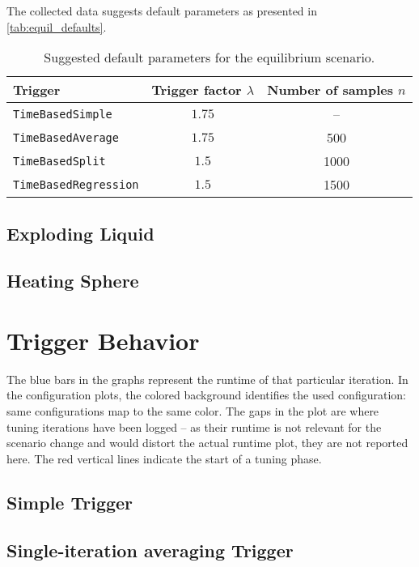 The collected data suggests default parameters as presented in \autoref{tab:equil_defaults}.
\begin{table}[htpb]
	\centering
	\begin{tabular}{lcc}
		\toprule
		\textbf{Trigger}                      & \textbf{Trigger factor $\lambda$} & \textbf{Number of samples $n$} \\ [0em]
		\midrule
		\texttt{TimeBasedSimple}     & $1.75$                   & --                     \\
		\texttt{TimeBasedAverage}    & $1.75$                   & 500                   \\
		\texttt{TimeBasedSplit}      & $1.5$                    & 1000                  \\
		\texttt{TimeBasedRegression} & $1.5$                    & 1500                  \\
		\bottomrule
	\end{tabular}
	\caption{Suggested default parameters for the equilibrium scenario.}
	\label{tab:equil_defaults}
\end{table}

\subsection{Exploding Liquid}
\subsection{Heating Sphere}

\section{Trigger Behavior}
The blue bars in the graphs represent the runtime of that particular iteration.
In the configuration plots, the colored background identifies the used configuration: same configurations map to the same color. The gaps in the plot are where tuning iterations have been logged -- as their runtime is not relevant for the scenario change and would distort the actual runtime plot, they are not reported here. The red vertical lines indicate the start of a tuning phase.

\subsection{Simple Trigger}
\subsection{Single-iteration averaging Trigger}
